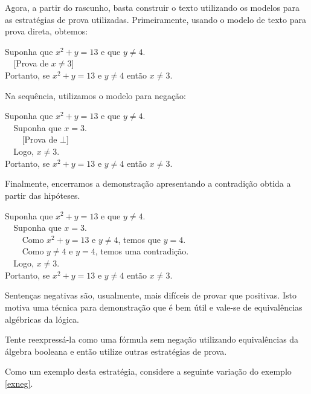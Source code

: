 \begin{Example}
Agora, a partir do rascunho, basta construir o texto utilizando os
modelos para as estratégias de prova utilizadas. Primeiramente, usando
o modelo de texto para prova direta, obtemos:
\begin{flushleft}
Suponha que $x^2 + y = 13$ e que $y \neq 4$.\\
\verb|  |[Prova de $x\neq 3$]\\
Portanto, se $x^2 + y = 13$ e $y \neq 4$ então $x \neq 3$.
\end{flushleft}
Na sequência, utilizamos o modelo para negação:
\begin{flushleft}
Suponha que $x^2 + y = 13$ e que $y \neq 4$.\\
\verb|  |Suponha que $x = 3$.\\
\verb|    |[Prova de $\bot$]\\
\verb|  |Logo, $x\neq 3$.\\
Portanto, se $x^2 + y = 13$ e $y \neq 4$ então $x \neq 3$.
\end{flushleft}
Finalmente, encerramos a demonstração apresentando a contradição
obtida a partir das hipóteses.
\begin{flushleft}
Suponha que $x^2 + y = 13$ e que $y \neq 4$.\\
\verb|  |Suponha que $x = 3$.\\
\verb|    |Como $x^2 + y = 13$ e $y\neq 4$, temos que $y = 4$.\\
\verb|    |Como $y \neq 4$ e $y = 4$, temos uma contradição.\\
\verb|  |Logo, $x\neq 3$.\\
Portanto, se $x^2 + y = 13$ e $y \neq 4$ então $x \neq 3$.
\end{flushleft}
\end{Example}
Sentenças negativas são, usualmente, mais difíceis de provar que
positivas. Isto motiva uma técnica para demonstração que é bem útil e
vale-se de equivalências algébricas da lógica.
\begin{ProofStrategy}\label{neg2}
Tente reexpressá-la como uma fórmula sem negação utilizando
equivalências da álgebra booleana e então utilize outras estratégias de prova.
\end{ProofStrategy}
Como um exemplo desta estratégia, considere a seguinte variação do
exemplo \ref{exneg}.
